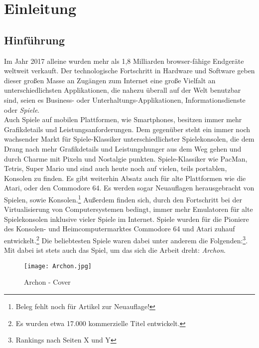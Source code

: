 \chapter{Einleitung}
\label{cha:Einleitung}

\section{Hinführung}
\label{sec:hinfuhrung}
Im Jahr 2017 alleine wurden mehr als 1,8 Milliarden browser-fähige Endgeräte weltweit verkauft.\cite{statista_absatz} Der technologische Fortschritt in Hardware und Software geben dieser großen Masse an Zugängen zum Internet eine große Vielfalt an unterschiedlichsten Applikationen, die nahezu überall auf der Welt benutzbar sind, seien es Business- oder Unterhaltungs-Applikationen, Informationsdienste oder \emph{Spiele}.\\
Auch Spiele auf mobilen Plattformen, wie Smartphones, besitzen immer mehr Grafikdetails und Leistungsanforderungen.
Dem gegenüber steht ein immer noch wachsender Markt für Spiele-Klassiker unterschiedlichster Spielekonsolen, die dem Drang nach mehr Grafikdetails und Leistungshunger aus dem Weg gehen und durch Charme mit Pixeln und Nostalgie punkten. Spiele-Klassiker wie PacMan, Tetris, Super Mario und \uvm sind auch heute noch auf vielen, teils portablen, Konsolen zu finden. Es gibt weiterhin Absatz auch für alte Plattformen wie die Atari, oder den Commodore 64. Es werden sogar Neuauflagen herausgebracht von Spielen, sowie Konsolen.\footnote{Beleg fehlt noch für Artikel zur Neuauflage!} Außerdem finden sich, durch den Fortschritt bei der Virtualisierung von Computersystemen bedingt, immer mehr Emulatoren für alte Spielekonsolen inklusive vieler Spiele im Internet.
Spiele wurden für die Pioniere des Konsolen- und Heimcomputermarktes Commodore 64 und Atari zuhauf entwickelt.\footnote{Es wurden etwa 17.000 kommerzielle Titel entwickelt.\cite{commodore64}}
Die beliebtesten Spiele waren dabei unter anderem die Folgenden:\footnote{Rankings nach Seiten X und Y}.\\
Mit dabei ist stets auch das Spiel, um das sich die Arbeit dreht: \emph{Archon}.\\
\begin{figure}[htp]
\centering
\captionsetup{justification=centering}
\texttt{[image: Archon.jpg]}
\caption[Archon - Cover]{Archon - Cover\footnotemark}
\label{fig:Archon_Cover}
\end{figure}

